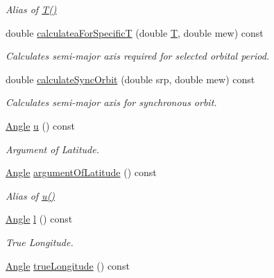 \begin{DoxyCompactItemize}
\begin{DoxyCompactList}\small\item\em Alias of \hyperlink{class_orbit3_d_a5f4c3402ffe5024fa383ccba9d9da88a}{T()} \end{DoxyCompactList}\item 
double \hyperlink{class_orbit3_d_aca94003de3900c7e0353d44b6139bccd}{calculatea\+For\+Specific\+T} (double \hyperlink{class_orbit3_d_a5f4c3402ffe5024fa383ccba9d9da88a}{T}, double mew) const 
\begin{DoxyCompactList}\small\item\em Calculates semi-\/major axis required for selected orbital period. \end{DoxyCompactList}\item 
double \hyperlink{class_orbit3_d_ae3343982c02aa65cc8907aa825430ca7}{calculate\+Sync\+Orbit} (double srp, double mew) const 
\begin{DoxyCompactList}\small\item\em Calculates semi-\/major axis for synchronous orbit. \end{DoxyCompactList}\item 
\hyperlink{class_angle}{Angle} \hyperlink{class_orbit3_d_a0d34eaecc2589911c99e83fbc7534d4e}{u} () const 
\begin{DoxyCompactList}\small\item\em Argument of Latitude. \end{DoxyCompactList}\item 
\hypertarget{class_orbit3_d_adb582a3a80af66e68046b4079acb19da}{\hyperlink{class_angle}{Angle} \hyperlink{class_orbit3_d_adb582a3a80af66e68046b4079acb19da}{argument\+Of\+Latitude} () const }\label{class_orbit3_d_adb582a3a80af66e68046b4079acb19da}

\begin{DoxyCompactList}\small\item\em Alias of \hyperlink{class_orbit3_d_a0d34eaecc2589911c99e83fbc7534d4e}{u()} \end{DoxyCompactList}\item 
\hypertarget{class_orbit3_d_a45299ea39b36dd386012296ccbc228c1}{\hyperlink{class_angle}{Angle} \hyperlink{class_orbit3_d_a45299ea39b36dd386012296ccbc228c1}{l} () const }\label{class_orbit3_d_a45299ea39b36dd386012296ccbc228c1}

\begin{DoxyCompactList}\small\item\em True Longitude. \end{DoxyCompactList}\item 
\hypertarget{class_orbit3_d_aa6b53e359790913ebe55bc7af0a2c6e6}{\hyperlink{class_angle}{Angle} \hyperlink{class_orbit3_d_aa6b53e359790913ebe55bc7af0a2c6e6}{true\+Longitude} () const }\label{class_orbit3_d_aa6b53e359790913ebe55bc7af0a2c6e6}


\end{DoxyCompactItemize}
